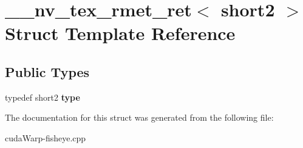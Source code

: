 \hypertarget{struct____nv__tex__rmet__ret_3_01short2_01_4}{}\section{\+\_\+\+\_\+nv\+\_\+tex\+\_\+rmet\+\_\+ret$<$ short2 $>$ Struct Template Reference}
\label{struct____nv__tex__rmet__ret_3_01short2_01_4}
\subsection*{Public Types}
\begin{DoxyCompactItemize}
\item 
typedef short2 {\bfseries type}\hypertarget{struct____nv__tex__rmet__ret_3_01short2_01_4_a06f36b2b639399f5e0170e9c91cb68ce}{}\label{struct____nv__tex__rmet__ret_3_01short2_01_4_a06f36b2b639399f5e0170e9c91cb68ce}

\end{DoxyCompactItemize}


The documentation for this struct was generated from the following file\+:\begin{DoxyCompactItemize}
\item 
cuda\+Warp-\/fisheye.\+cpp\end{DoxyCompactItemize}

